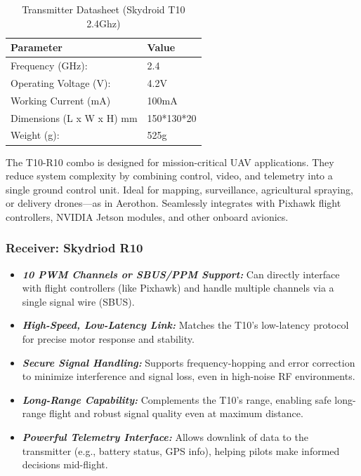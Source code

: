\documentclass[12pt]{report}
\begin{document}
      \begin{table}[h!]
        \centering
        \caption{Transmitter Datasheet (Skydroid T10 2.4Ghz)}
        \begin{tabular}{|l|p{6cm}|}
          \hline
          \textbf{Parameter} & \textbf{Value} \\
          \hline
          Frequency (GHz):	&    2.4 \\
          Operating Voltage (V):	&    4.2V \\
          Working Current (mA)	&   100mA \\
          Dimensions (L x W x H) mm	&      150*130*20 \\
          Weight (g):	 & 525g      \\
          \hline
        \end{tabular}
      \end{table}

       The T10-R10 combo is designed for mission-critical UAV applications. They reduce system complexity by combining control, video, and telemetry into a single ground control unit. Ideal for mapping, surveillance, agricultural spraying, or delivery drones—as in Aerothon. Seamlessly integrates with Pixhawk flight controllers, NVIDIA Jetson modules, and other onboard avionics.


      \subsubsection{\large Receiver: Skydriod R10}
      \begin{itemize}
        \item \textbf{\textit{10 PWM Channels or SBUS/PPM Support:}} Can directly interface with flight controllers (like Pixhawk) and handle multiple channels via a single signal wire (SBUS).


        \item \textbf{\textit{High-Speed, Low-Latency Link:}} Matches the T10’s low-latency protocol for precise motor response and stability.
        \item \textbf{\textit{Secure Signal Handling:}} Supports frequency-hopping and error correction to minimize interference and signal loss, even in high-noise RF environments.
        \item \textbf{\textit{Long-Range Capability:}} Complements the T10’s range, enabling safe long-range flight and robust signal quality even at maximum distance.
        \item \textbf{\textit{Powerful Telemetry Interface:}} Allows downlink of data to the transmitter (e.g., battery status, GPS info), helping pilots make informed decisions mid-flight.
      \end{itemize}
\end{document}
